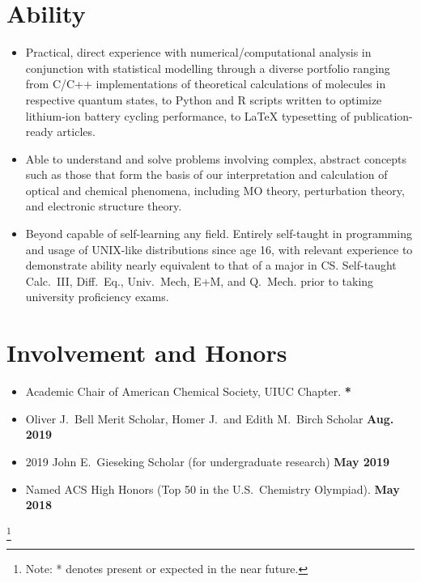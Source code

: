 \documentclass{article}
\begin{document}
\section{Ability}
\begin{itemize}[noitemsep,nolistsep]
	\item Practical, direct experience with numerical/computational analysis
	in conjunction with statistical modelling through a diverse portfolio
	ranging from C/C++ implementations of theoretical calculations of
	molecules in respective quantum states, to Python and R scripts written
	to optimize lithium-ion battery cycling performance, to LaTeX
	typesetting of publication-ready articles.

	\item Able to understand and solve problems involving complex, abstract
	concepts such as those that form the basis of our interpretation and
	calculation of optical and chemical phenomena, including MO theory,
	perturbation theory, and electronic structure theory.

	\item Beyond capable of self-learning any field. Entirely self-taught in
	programming and usage of UNIX-like distributions since age 16, with
	relevant experience to demonstrate ability nearly equivalent to that of
	a major in CS.  Self-taught Calc.\ III, Diff.\ Eq., Univ.\ Mech, E+M,
	and Q.\ Mech. prior to taking university proficiency exams.

\end{itemize}

\section{Involvement and Honors}
\begin{itemize}[noitemsep,nolistsep]
	\item Academic Chair of American Chemical Society, UIUC Chapter.
	\hfill\textbf{*}

	\item Oliver J.\ Bell Merit Scholar, Homer J.\ and Edith M.\ Birch
	Scholar
	\hfill\textbf{Aug. 2019}

	\item 2019 John E.\ Gieseking Scholar (for undergraduate research)
	\hfill\textbf{May 2019}

	\item Named ACS High Honors (Top 50 in the U.S.\ Chemistry Olympiad).
	\hfill\textbf{May 2018}
\end{itemize}

\newcommand\blfootnote[1]{%
	\begingroup
	\renewcommand\thefootnote{}\footnote{#1}%
	\addtocounter{footnote}{-1}%
	\endgroup
}
\blfootnote{Note: * denotes present or expected in the near future.}
\end{document}
